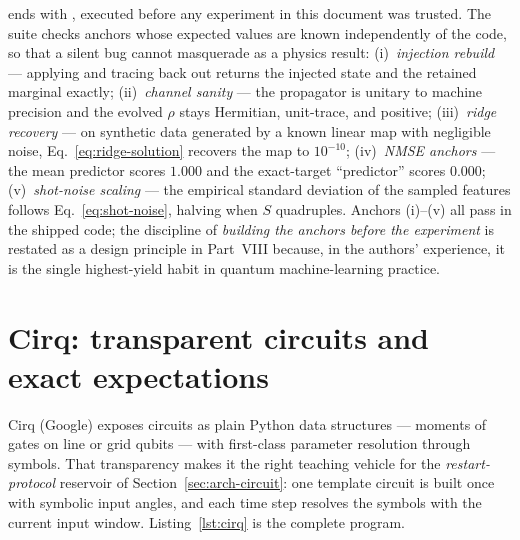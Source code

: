  ends with , executed before
any experiment in this document was trusted. The suite checks anchors whose
expected values are known independently of the code, so that a silent bug
cannot masquerade as a physics result: (i)~\emph{injection rebuild} --- applying
 and tracing back out returns the injected state and the retained
marginal exactly; (ii)~\emph{channel sanity} --- the propagator is unitary to
machine precision and the evolved $\rho$ stays Hermitian, unit-trace, and
positive; (iii)~\emph{ridge recovery} --- on synthetic data generated by a known
linear map with negligible noise, Eq.~\eqref{eq:ridge-solution} recovers the
map to $10^{-10}$; (iv)~\emph{NMSE anchors} --- the mean predictor scores
$1.000$ and the exact-target ``predictor'' scores $0.000$;
(v)~\emph{shot-noise scaling} --- the empirical standard deviation of the
sampled features follows Eq.~\eqref{eq:shot-noise}, halving when $S$
quadruples. Anchors (i)--(v) all pass in the shipped code; the discipline of
\emph{building the anchors before the experiment} is restated as a design
principle in Part~VIII because, in the authors' experience, it is the single
highest-yield habit in quantum machine-learning practice.

\section{Cirq: transparent circuits and exact expectations}
\label{sec:cirq}

Cirq (Google) exposes circuits as plain Python data structures --- moments of
gates on line or grid qubits --- with first-class parameter resolution through
 symbols. That transparency makes it the right teaching vehicle
for the \emph{restart-protocol} reservoir of
Section~\ref{sec:arch-circuit}: one template circuit is built once with
symbolic input angles, and each time step resolves the symbols with the
current input window. Listing~\ref{lst:cirq} is the complete program.

\begin{strip}

\end{strip}

